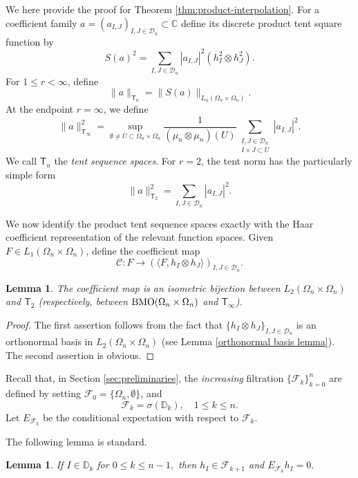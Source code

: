 \documentclass{amsart}
\numberwithin{equation}{section}
\newtheorem{lem}[thm]{Lemma}
\theoremstyle{definition}
\theoremstyle{remark}
\newcommand{\1}{\mathbf 1}
\newcommand{\T}{\mathsf T}
\begin{document}
We here provide the proof for Theorem \ref{thm:product-interpolation}. 
For a coefficient family $a=(a_{I,J})_{I,J\in\mathcal{D}_n} \subset \mathbb{C}$ define its discrete product tent square function by
$$S(a)^2=\sum_{I,J\in\mathcal{D}_n}|a_{I,J}|^2(h_I^2\otimes h_J^2).$$
For $1\leq r<\infty$, define
\begin{equation*}
\|a\|_{\T_u}=\|S(a)\|_{L_u(\Omega_n\times\Omega_n)}.
\end{equation*}
At the endpoint $r=\infty$, we define
$$\|a\|_{\T_{\infty}}^2=\sup_{\emptyset\neq U\subset \Omega_n\times\Omega_n}
 \frac1{(\mu_n\otimes\mu_n)(U)}\sum_{\substack{I,J\in\mathcal{D}_n\\ I\times J\subset U}}|a_{I,J}|^2.$$
We call $\T_u$ the \emph{tent sequence spaces}.
For $r=2$, the tent norm has the particularly simple form
\begin{equation*}
\|a\|_{\T_2}^{2}=\sum_{I,J\in\mathcal{D}_n}|a_{I,J}|^2.
\end{equation*}

We now identify the product tent sequence spaces exactly with the Haar
coefficient representation of the relevant function spaces. 
Given $F\in L_1(\Omega_n\times\Omega_n)$, define the coefficient map
\begin{equation*}
\mathcal{C}:F\to \left(
\langle F,h_I\otimes h_J\rangle
\right)_{I,J\in\mathcal{D}_n}.
\end{equation*}

\begin{lem}\label{lem:haar-tent}
The coefficient map is an isometric bijection between $L_2(\Omega_n\times\Omega_n)$ and $\T_2$ (respectively, between ${\rm BMO}(\Omega_n\times\Omega_n)$ and $\T_{\infty}$).
\end{lem}
\begin{proof} The first assertion follows from the fact that $\{h_I\otimes h_J\}_{I,J\in\mathcal{D}_n}$ is an orthonormal basis in $L_2(\Omega_n\times\Omega_n)$ (see Lemma \ref{orthonormal basis lemma}). The second assertion is obvious.
\end{proof}

Recall that, in Section \ref{sec:preliminaries}, the {\it increasing} filtration $\{\mathcal{F}_k\}_{k=0}^n$ are defined  by setting $\mathcal{F}_0=\{\Omega_{n},\emptyset\}$, and 
$$\mathcal{F}_k=\sigma(\mathbb{D}_k), \quad 1\leq k\leq n.$$
Let $E_{\mathcal{F}_k}$ be the conditional expectation with respect to $\mathcal{F}_{k}$.

The following lemma is standard.
\begin{lem}\label{conditional expectation of haar} If $I\in\mathbb{D}_k$ for $0\leq k\leq n-1,$ then $h_I\in\mathcal{F}_{k+1}$ and $E_{\mathcal{F}_k}h_I=0.$ 
\end{lem}
\end{document}
